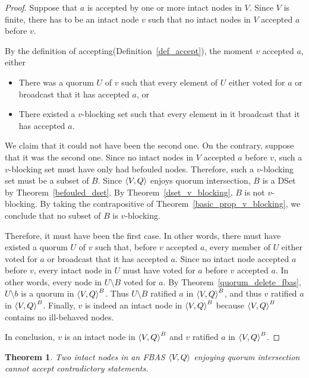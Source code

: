 \documentclass[12pt, psamsfonts]{amsart}
\newtheorem{thm}{Theorem}[subsection]
\theoremstyle{definition}
\theoremstyle{remark}
\numberwithin{equation}{subsection}
\begin{document}
\begin{proof}
    Suppose that $a$ is accepted by one or more intact nodes in $V$.
    Since $V$ is finite, there has to be an intact node $v$ such that no intact nodes in $V$ accepted $a$ before $v$.

    By the definition of accepting(Definition~\ref{def_accept}), the moment $v$ accepted $a$, either
    \begin{itemize}
        \item
            There was a quorum $U$ of $v$ such that every element of $U$ either voted for $a$ or broadcast that it has accepted $a$, or
        \item
            There existed a $v$-blocking set such that every element in it broadcast that it has accepted $a$.
    \end{itemize}
    We claim that it could not have been the second one.
    On the contrary, suppose that it was the second one.
    Since no intact nodes in $V$ accepted $a$ before $v$, such a $v$-blocking set must have only had befouled nodes.
    Therefore, such a $v$-blocking set must be a subset of $B$.
    Since $\ev{V, Q}$ enjoys quorum intersection, $B$ is a DSet by Theorem~\ref{befouled_dset}.
    By Theorem~\ref{dset_v_blocking}, $B$ is not $v$-blocking.
    By taking the contrapositive of Theorem~\ref{basic_prop_v_blocking}, we conclude that no subset of $B$ is $v$-blocking.

    Therefore, it must have been the first case.
    In other words, there must have existed a quorum $U$ of $v$ such that, before $v$ accepted $a$, every member of $U$ either voted for $a$ or broadcast that it has accepted $a$.
    Since no intact node accepted $a$ before $v$, every intact node in $U$ must have voted for $a$ before $v$ accepted $a$.
    In other words, every node in $U \setminus B$ voted for $a$.
    By Theorem~\ref{quorum_delete_fbas}, $U \setminus b$ is a quorum in $\ev{V, Q}^B$.
    Thus  $U \setminus B$ ratified $a$ in ${\ev{V, Q}}^B$, and thus $v$ ratified $a$ in $\ev{V, Q}^B$.
    Finally, $v$ is indeed an intact node in ${\ev{V, Q}}^B$ because ${\ev{V, Q}}^B$ contains no ill-behaved nodes.

    In conclusion, $v$ is an intact node in $\ev{V, Q}^B$ and $v$ ratified $a$ in $\ev{V, Q}^B$.
\end{proof}

\begin{thm}\label{intact_accept_contradictory}
    Two intact nodes in an FBAS $\ev{V, Q}$ enjoying quorum intersection cannot accept contradictory statements.
\end{thm}
\end{document}
